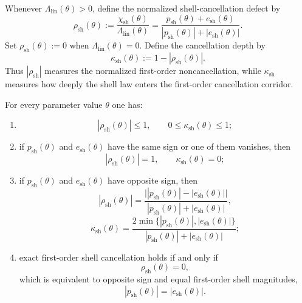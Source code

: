 \begin{definition}
Whenever $\Lambda_{\mathrm{lin}}(\theta)>0$, define the normalized shell-cancellation defect by
\[
  \rho_{\mathrm{sh}}(\theta):=\frac{\chi_{\mathrm{sh}}(\theta)}{\Lambda_{\mathrm{lin}}(\theta)}
  =\frac{p_{\mathrm{sh}}(\theta)+e_{\mathrm{sh}}(\theta)}{|p_{\mathrm{sh}}(\theta)|+|e_{\mathrm{sh}}(\theta)|}.
\]
Set $\rho_{\mathrm{sh}}(\theta):=0$ when $\Lambda_{\mathrm{lin}}(\theta)=0$. Define the cancellation depth by
\[
  \kappa_{\mathrm{sh}}(\theta):=1-|\rho_{\mathrm{sh}}(\theta)|.
\]
Thus $|\rho_{\mathrm{sh}}|$ measures the normalized first-order noncancellation, while $\kappa_{\mathrm{sh}}$ measures how deeply the shell law enters the first-order cancellation corridor.
\end{definition}

\begin{theorem}
For every parameter value $\theta$ one has:
\begin{enumerate}[leftmargin=2em,label=(\roman*)]
\item
\[
  |\rho_{\mathrm{sh}}(\theta)|\le 1,
  \qquad
  0\le \kappa_{\mathrm{sh}}(\theta)\le 1;
\]
\item if $p_{\mathrm{sh}}(\theta)$ and $e_{\mathrm{sh}}(\theta)$ have the same sign or one of them vanishes, then
\[
  |\rho_{\mathrm{sh}}(\theta)|=1,
  \qquad
  \kappa_{\mathrm{sh}}(\theta)=0;
\]
\item if $p_{\mathrm{sh}}(\theta)$ and $e_{\mathrm{sh}}(\theta)$ have opposite sign, then
\[
  |\rho_{\mathrm{sh}}(\theta)|
  =\frac{\bigl||p_{\mathrm{sh}}(\theta)|-|e_{\mathrm{sh}}(\theta)|\bigr|}{|p_{\mathrm{sh}}(\theta)|+|e_{\mathrm{sh}}(\theta)|},
\]
\[
  \kappa_{\mathrm{sh}}(\theta)
  =\frac{2\min\{|p_{\mathrm{sh}}(\theta)|,|e_{\mathrm{sh}}(\theta)|\}}{|p_{\mathrm{sh}}(\theta)|+|e_{\mathrm{sh}}(\theta)|};
\]
\item exact first-order shell cancellation holds if and only if
\[
  \rho_{\mathrm{sh}}(\theta)=0,
\]
which is equivalent to opposite sign and equal first-order shell magnitudes,
\[
  |p_{\mathrm{sh}}(\theta)|=|e_{\mathrm{sh}}(\theta)|.
\]
\end{enumerate}
\end{theorem}

